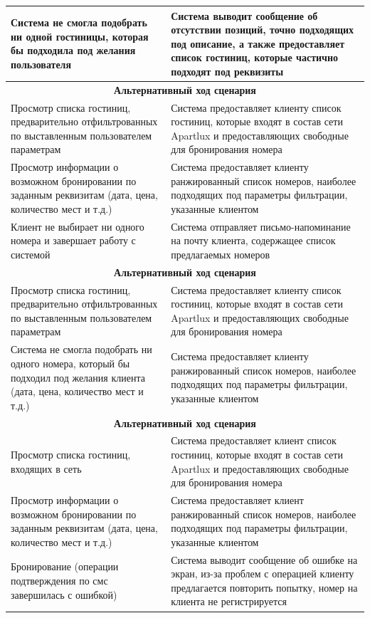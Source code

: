 \begin{longtable}{| p{6cm} | p{10cm} |}
	Система не смогла подобрать ни одной гостиницы, которая бы подходила под желания пользователя
	&
	Система выводит сообщение об отсутствии позиций, точно подходящих под описание, а также предоставляет список гостиниц, которые частично подходят под реквизиты
	\\
	\hline
	
	\multicolumn{2}{|c|}{\textbf{Альтернативный ход сценария}} \\
	\hline
	
	Просмотр списка гостиниц, предварительно отфильтрованных по выставленным пользователем параметрам
	&
	Система предоставляет клиенту список гостиниц, которые входят в состав сети Apartlux и предоставляющих свободные для бронирования номера \\
	\hline
	
	Просмотр информации о возможном бронировании по заданным реквизитам (дата, цена, количество мест и т.д.)
	&
	Система предоставляет клиенту ранжированный список номеров, наиболее подходящих под параметры фильтрации, указанные клиентом \\
	\hline
	
	Клиент не выбирает ни одного номера и завершает работу с системой
	&
	Система отправляет письмо-напоминание на почту клиента, содержащее список предлагаемых номеров
	\\
	\hline
	
	\multicolumn{2}{|c|}{\textbf{Альтернативный ход сценария}} \\
	\hline
	
	Просмотр списка гостиниц, предварительно отфильтрованных по выставленным пользователем параметрам
	&
	Система предоставляет клиенту список гостиниц, которые входят в состав сети Apartlux и предоставляющих свободные для бронирования номера \\
	\hline
	
	Система не смогла подобрать ни одного номера, который бы подходил под желания клиента  (дата, цена, количество мест и т.д.)
	&
	Система предоставляет клиенту ранжированный список номеров, наиболее подходящих под параметры фильтрации, указанные клиентом \\
	\hline
	
	
	\multicolumn{2}{|c|}{\textbf{Альтернативный ход сценария}} \\
	\hline
	
	Просмотр списка гостиниц, входящих в сеть
	&
	Система предоставляет клиент список гостиниц, которые входят в состав сети Apartlux и предоставляющих свободные для бронирования номера \\
	\hline
	
	Просмотр информации о возможном бронировании по заданным реквизитам (дата, цена, количество мест и т.д.)
	&
	Система предоставляет клиент ранжированный список номеров, наиболее подходящих под параметры фильтрации, указанные клиентом \\
	\hline
	
	Бронирование (операции подтверждения по смс завершилась с ошибкой)
	&
	Система выводит сообщение об ошибке на экран, из-за проблем с операцией клиенту предлагается повторить попытку, номер на клиента не регистрируется
\end{longtable}

